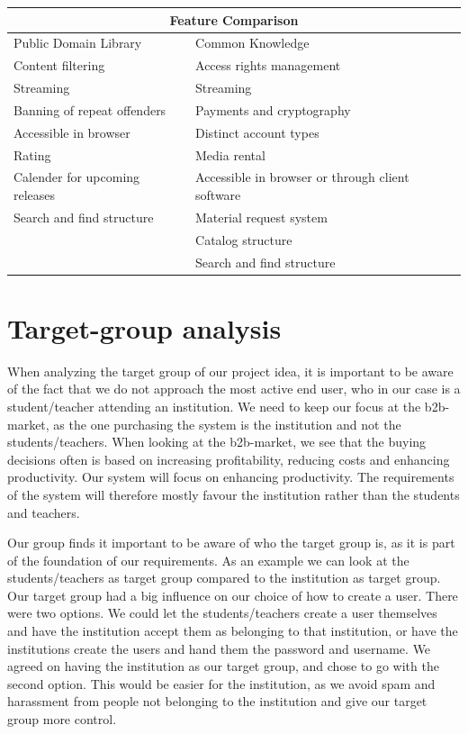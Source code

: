 \documentclass[10pt,a4paper]{article}
\begin{document}
\begin{tabularx}{\textwidth} {|X|X|}
\hline
\multicolumn{2}{|c|}{{\bfseries Feature Comparison}}\\
\hline
Public Domain Library & Common Knowledge \\
\hline
Content filtering & Access rights management \\
Streaming & Streaming\\
Banning of repeat offenders & Payments and cryptography\\
Accessible in browser & Distinct account types\\
Rating & Media rental\\
Calender for upcoming releases& Accessible in browser or through client software\\
Search and find structure & Material request system \\
& Catalog structure\\
& Search and find structure\\
\hline
\end{tabularx}

\section{Target-group analysis}
When analyzing the target group of our project idea, it is important to be aware of the fact that we do not approach the most active end user, who in our case is a student/teacher attending an institution. We need to keep our focus at the b2b-market, as the one purchasing the system is the institution and not the students/teachers. When looking at the b2b-market, we see that the buying decisions often is based on increasing profitability, reducing costs and enhancing productivity. Our system will focus on enhancing productivity. The requirements of the system will therefore mostly favour the institution rather than the students and teachers. 

Our group finds it important to be aware of who the target group is, as it is part of the foundation of our requirements. As an example we can look at the students/teachers as target group compared to the institution as target group. Our target group had a big influence on our choice of how to create a user. There were two options. We could let the students/teachers create a user themselves and have the institution accept them as belonging to that institution, or have the institutions create the users and hand them the password and username.
We agreed on having the institution as our target group, and chose to go with the second option. This would be easier for the institution, as we avoid spam and harassment from people not belonging to the institution and give our target group more control.
\end{document}

